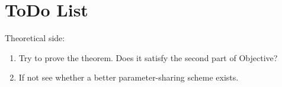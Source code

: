 \documentclass{article}
\def\todo#1{{\color{red}{{todo:\ #1\ }}}}
\newcommand{\mat}[1]{\ensuremath{\mathbf{#1}}}
\newcommand{\set}[1]{\ensuremath{\mathbb{#1}}}
\newcommand{\Trp}[0]{\ensuremath{^{\mathsf{T}}}}
\newcommand{\XX}[0]{\ensuremath{\mat{X}}}
\newcommand{\YY}[0]{\ensuremath{\mat{Y}}}
\newcommand{\yy}[0]{\ensuremath{\mat{y}}}
\newcommand{\zz}[0]{\ensuremath{\mat{z}}}
\renewcommand{\Re}[0]{\ensuremath{\set{R}}}
\theoremstyle{definition}
\begin{document}




\section{ToDo List}
Theoretical side:
\begin{enumerate}
\item Try to prove the theorem. Does it satisfy the second part of Objective? 
\item If not see whether a better parameter-sharing scheme exists.
\end{enumerate}
\end{document}
